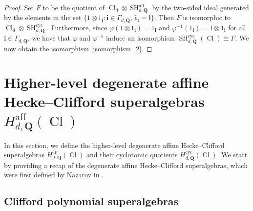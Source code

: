 \documentclass[11pt]{amsart}
\newcommand\go{\mathsf{I}}              %
\theoremstyle{definition}
\numberwithin{equation}{section}
\begin{document}
\begin{proof}
Set $ F $ to be the quotient of $ \operatorname{Cl}_{d} \otimes \operatorname{SH}^{\operatorname{aff}}_{d,\mathbf{Q}} $ by the two-sided ideal generated by the elements in the set $ \{1 \otimes 1_{\mathbf{i}} : \mathbf{i} \in \Gamma_{d,\mathbf{Q}}, \ \mathbf{i}_{1} = \go \} $. Then $ F $ is isomorphic to $ \operatorname{Cl}_{d} \otimes \operatorname{SH}^{\operatorname{cyc}}_{d,\mathbf{Q}} $. Furthermore, since $ \varphi(1 \otimes 1_{\mathbf{i}}) = 1_{\mathbf{i}} $ and $ \varphi^{-1}(1_{\mathbf{i}}) = 1 \otimes 1_{\mathbf{i}} $ for all $ \mathbf{i} \in \Gamma_{d,\mathbf{Q}} $, we have that $ \varphi $ and $ \varphi^{-1} $ induce an isomorphism $ \operatorname{SH}^{\operatorname{cyc}}_{d,\mathbf{Q}}(\operatorname{Cl}) \cong F $. We now obtain the isomorphism \cref{isomorphism_2}.
\end{proof}




\section{Higher-level degenerate affine Hecke--Clifford superalgebras $ H_{d,\mathbf{Q}}^{\operatorname{aff}}(\operatorname{Cl}) $} \label{HLDAHCA_Section}

In this section, we define the higher-level degenerate affine Hecke--Clifford superalgebras $ H_{d,\mathbf{Q}}^{\operatorname{aff}}(\operatorname{Cl}) $ and their cyclotomic quotients $ H_{d,\mathbf{Q}}^{\operatorname{cyc}}(\operatorname{Cl}) $. We start by providing a recap of the degenerate affine Hecke--Clifford superalgebras, which were first defined by Nazarov in \cite{Nazarov}.



\subsection{Clifford polynomial superalgebras}
\end{document}

